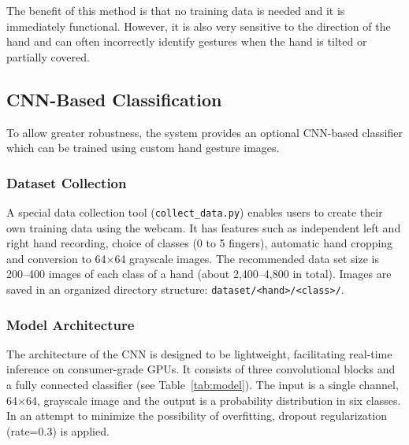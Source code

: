 \documentclass[conference]{IEEEtran}
\begin{document}
The benefit of this method is that no training data is needed and it is immediately functional. However, it is also very sensitive to the direction of the hand and can often incorrectly identify gestures when the hand is tilted or partially covered.

\subsection{CNN-Based Classification}

To allow greater robustness, the system provides an optional CNN-based classifier which can be trained using custom hand gesture images.

\subsubsection{Dataset Collection}

A special data collection tool (\texttt{collect\_data.py}) enables users to create their own training data using the webcam. It has features such as independent left and right hand recording, choice of classes (0 to 5 fingers), automatic hand cropping and conversion to 64$\times$64 grayscale images. The recommended data set size is 200--400 images of each class of a hand (about 2,400--4,800 in total). Images are saved in an organized directory structure: \texttt{dataset/<hand>/<class>/}.

\subsubsection{Model Architecture}

The architecture of the CNN is designed to be lightweight, facilitating real-time inference on consumer-grade GPUs. It consists of three convolutional blocks and a fully connected classifier (see Table~\ref{tab:model}). The input is a single channel, 64$\times$64, grayscale image and the output is a probability distribution in six classes. In an attempt to minimize the possibility of overfitting, dropout regularization (rate=0.3) is applied.
\end{document}
